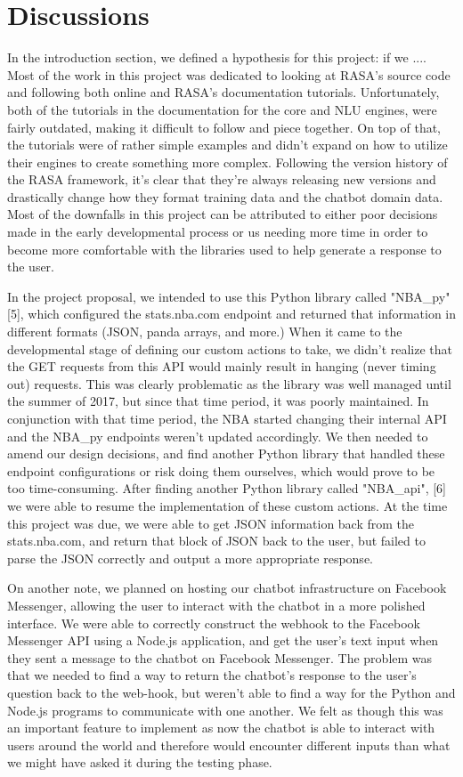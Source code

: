 \documentclass[conference]{IEEEtran}
\begin{document}
\section*{Discussions}
In the introduction section, we defined a hypothesis for this project: if we .... Most of the work in this project was dedicated to looking at RASA's source code and following both online and RASA's documentation tutorials. Unfortunately, both of the tutorials in the documentation for the core and NLU engines, were fairly outdated, making it difficult to follow and piece together. On top of that, the tutorials were of rather simple examples and didn't expand on how to utilize their engines to create something more complex. Following the version history of the RASA framework, it's clear that they're always releasing new versions and drastically change how they format training data and the chatbot domain data. Most of the downfalls in this project can be attributed to either poor decisions made in the early developmental process or us needing more time in order to become more comfortable with the libraries used to help generate a response to the user.

In the project proposal, we intended to use this Python library called "NBA\_py" [5], which configured the stats.nba.com endpoint and returned that information in different formats (JSON, panda arrays, and more.) When it came to the developmental stage of defining our custom actions to take, we didn't realize that the GET requests from this API would mainly result in hanging (never timing out) requests. This was clearly problematic as the library was well managed until the summer of 2017, but since that time period, it was poorly maintained. In conjunction with that time period, the NBA started changing their internal API and the NBA\_py endpoints weren't updated accordingly. We then needed to amend our design decisions, and find another Python library that handled these endpoint configurations or risk doing them ourselves, which would prove to be too time-consuming. After finding another Python library called "NBA\_api", [6] we were able to resume the implementation of these custom actions. At the time this project was due, we were able to get JSON information back from the stats.nba.com, and return that block of JSON back to the user, but failed to parse the JSON correctly and output a more appropriate response.

On another note, we planned on hosting our chatbot infrastructure on Facebook Messenger, allowing the user to interact with the chatbot in a more polished interface. We were able to correctly construct the webhook to the Facebook Messenger API using a Node.js application, and get the user's text input when they sent a message to the chatbot on Facebook Messenger. The problem was that we needed to find a way to return the chatbot's response to the user's question back to the web-hook, but weren't able to find a way for the Python and Node.js programs to communicate with one another. We felt as though this was an important feature to implement as now the chatbot is able to interact with users around the world and therefore would encounter different inputs than what we might have asked it during the testing phase.
\end{document}
